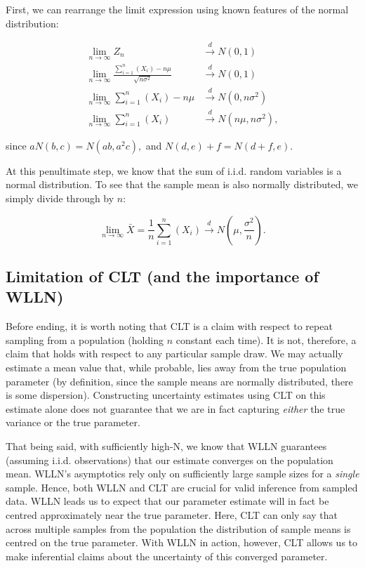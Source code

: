 \documentclass[
]{book}
\begin{document}
First, we can rearrange the limit expression using known features of the normal distribution:

\begin{align}
\lim_{n \to \infty}Z_n & \xrightarrow{d} N(0,1) \\
\lim_{n \to \infty} \frac{\sum_{i=1}^{n}(X_i) - n\mu}{\sqrt{n\sigma^2}} & \xrightarrow{d} N(0,1) \\
\lim_{n \to \infty} \sum_{i=1}^{n}(X_i) - n\mu & \xrightarrow{d} N(0,n\sigma^2) \\
\lim_{n \to \infty} \sum_{i=1}^{n}(X_i) & \xrightarrow{d} N(n\mu,n\sigma^2),
\end{align}

since \(aN(b,c) = N(ab, a^2c),\) and \(N(d,e) + f = N(d+f, e).\)

At this penultimate step, we know that the sum of i.i.d. random variables is a normal distribution. To see that the sample mean is also normally distributed, we simply divide through by \(n\):

\begin{equation}
\lim_{n \to \infty} \bar{X} = \frac{1}{n}\sum_{i=1}^{n}(X_i) \xrightarrow{d} N(\mu,\frac{\sigma^2}{n}).
\end{equation}

\hypertarget{limitation-of-clt-and-the-importance-of-wlln}{%
\subsection{Limitation of CLT (and the importance of WLLN)}\label{limitation-of-clt-and-the-importance-of-wlln}}

Before ending, it is worth noting that CLT is a claim with respect to repeat sampling from a population (holding \(n\) constant each time). It is not, therefore, a claim that holds with respect to any particular sample draw. We may actually estimate a mean value that, while probable, lies away from the true population parameter (by definition, since the sample means are normally distributed, there is some dispersion). Constructing uncertainty estimates using CLT on this estimate alone does not guarantee that we are in fact capturing \emph{either} the true variance or the true parameter.

That being said, with sufficiently high-N, we know that WLLN guarantees (assuming i.i.d. observations) that our estimate converges on the population mean. WLLN's asymptotics rely only on sufficiently large sample sizes for a \emph{single} sample. Hence, both WLLN and CLT are crucial for valid inference from sampled data. WLLN leads us to expect that our parameter estimate will in fact be centred approximately near the true parameter. Here, CLT can only say that across multiple samples from the population the distribution of sample means is centred on the true parameter. With WLLN in action, however, CLT allows us to make inferential claims about the uncertainty of this converged parameter.
\end{document}
